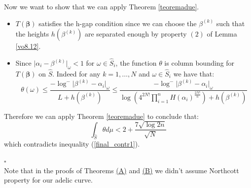 \documentclass[10 pt,a4paper]{article}
\theoremstyle{plain}
\theoremstyle{definition}
\theoremstyle{named}
\newcommand\bref[3][blue]{%
    \begingroup%
    \hypersetup{linkcolor=#1}%
    \hyperlink{#2}{#3}%
    \endgroup}
\begin{document}
Now we want to show that we can apply Theorem \ref{teoremadue}.
\begin{itemize}
\item[$\bullet$]$T(\bm{\beta})$ satisfies the h-gap condition since we can choose the $\beta^{(k)}$ such that the heights $h(\beta^{(k)})$ are separated enough by property $(2)$ of Lemma \ref{vo8.12}.
\item[$\bullet $]  Since $\vert\alpha_i-\beta^{(k)}\vert_\omega < 1$ for $\omega\in \hat S_i$,  the function $\theta$ is column bounding for $T(\bm{\beta})$  on $\hat S$. Indeed for any $k=1,\ldots, N$ and $\omega\in \hat S_i$ we have that:
$$\theta(\omega)\le \frac{-\log^- \vert \beta^{(k)}-\alpha_i\vert_{\omega}}{L+h(\beta^{(k)})}\le \frac{-\log^{-}\vert\beta^{(k)}-\alpha_i\vert_\omega}{\log\left(4^{2N!}\prod^n_{i=1}H(\alpha_i)^{\frac{2N!}{n}}\right) + h(\beta^{(k)})}$$
\end{itemize}
Therefore we can apply Theorem \ref{teoremadue} to conclude that:
$$
\int_{\hat S}\theta d \mu<2+\frac{7\sqrt{\log 2n}}{\sqrt{N}}
$$
which  contradicts inequality (\ref{final_contr1}).

\hfill{$\square$}
{}\\

Note that in the proofs of Theorems \bref{thm:main}{(A)} and \bref{thm:main}{(B)} we didn't assume Northcott property for our adelic curve.
\end{document}
